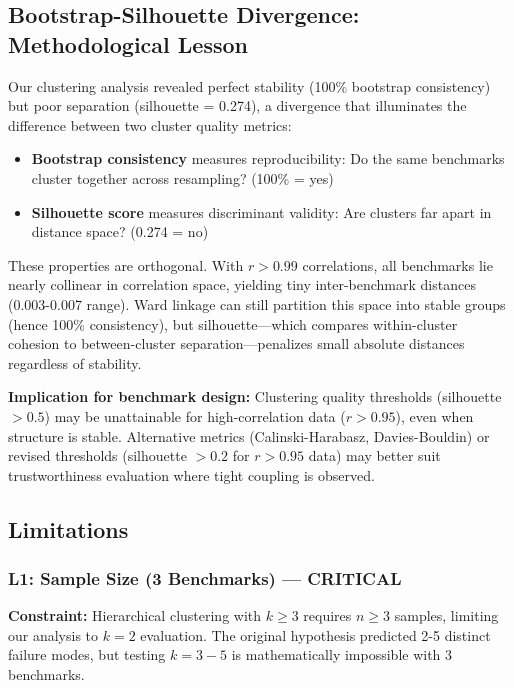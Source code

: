 \subsection{Bootstrap-Silhouette Divergence: Methodological Lesson}

Our clustering analysis revealed perfect stability (100\% bootstrap consistency) but poor separation (silhouette = 0.274), a divergence that illuminates the difference between two cluster quality metrics:
\begin{itemize}
\item \textbf{Bootstrap consistency} measures reproducibility: Do the same benchmarks cluster together across resampling? (100\% = yes)
\item \textbf{Silhouette score} measures discriminant validity: Are clusters far apart in distance space? (0.274 = no)
\end{itemize}

These properties are orthogonal. With $r > 0.99$ correlations, all benchmarks lie nearly collinear in correlation space, yielding tiny inter-benchmark distances (0.003-0.007 range). Ward linkage can still partition this space into stable groups (hence 100\% consistency), but silhouette---which compares within-cluster cohesion to between-cluster separation---penalizes small absolute distances regardless of stability.

\textbf{Implication for benchmark design:} Clustering quality thresholds (silhouette $> 0.5$) may be unattainable for high-correlation data ($r > 0.95$), even when structure is stable. Alternative metrics (Calinski-Harabasz, Davies-Bouldin) or revised thresholds (silhouette $> 0.2$ for $r > 0.95$ data) may better suit trustworthiness evaluation where tight coupling is observed.

\subsection{Limitations}

\subsubsection{L1: Sample Size (3 Benchmarks) --- CRITICAL}

\textbf{Constraint:} Hierarchical clustering with $k \geq 3$ requires $n \geq 3$ samples, limiting our analysis to $k=2$ evaluation. The original hypothesis predicted 2-5 distinct failure modes, but testing $k=3-5$ is mathematically impossible with 3 benchmarks.

